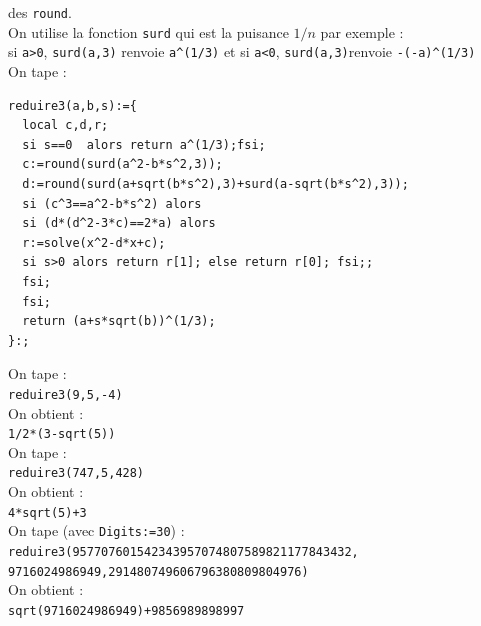 \documentclass[a4paper,11pt]{book}
\begin{document}
des {\tt round}.\\
On utilise la fonction {\tt surd} qui est la puisance $1/n$ par exemple :\\
si {\tt a>0}, {\tt surd(a,3)}  renvoie {\tt a\verb|^|(1/3)} et
si {\tt a<0}, {\tt surd(a,3)}renvoie {\tt -(-a)\verb|^|(1/3)}\\
On tape :\\
\begin{verbatim}
reduire3(a,b,s):={
  local c,d,r;
  si s==0  alors return a^(1/3);fsi;
  c:=round(surd(a^2-b*s^2,3));
  d:=round(surd(a+sqrt(b*s^2),3)+surd(a-sqrt(b*s^2),3));
  si (c^3==a^2-b*s^2) alors
  si (d*(d^2-3*c)==2*a) alors
  r:=solve(x^2-d*x+c);
  si s>0 alors return r[1]; else return r[0]; fsi;;
  fsi;
  fsi;
  return (a+s*sqrt(b))^(1/3);
}:;
\end{verbatim}
On tape  :\\
{\tt reduire3(9,5,-4)}\\
On obtient :\\
{\tt 1/2*(3-sqrt(5))}\\
On tape  :\\
{\tt reduire3(747,5,428)}\\
On obtient :\\
{\tt 4*sqrt(5)+3}\\
On tape (avec {\tt Digits:=30}) :\\
{\tt reduire3(957707601542343957074807589821177843432,
  9716024986949,291480749606796380809804976)}\\
On obtient :\\
{\tt sqrt(9716024986949)+9856989898997}
\end{document}
